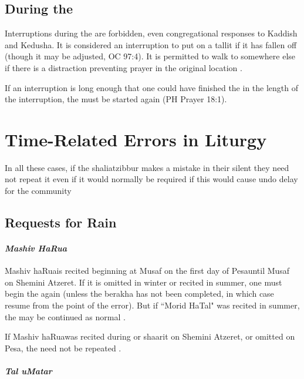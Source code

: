 \subsection{During the \amidah}

Interruptions during the \amidah are forbidden, even congregational responses to Kaddish and Kedusha. It is considered an interruption to put on a tallit if it has fallen off (though it may be adjusted, OC 97:4).  It is permitted to walk to somewhere else if there is a distraction preventing prayer in the original location \parencite*[17:15]{PH}.

If an interruption is long enough that one could have finished the \amidah in the length of the interruption, the \amidah must be started again (PH Prayer 18:1).

\section{Time-Related Errors in Liturgy}

In all these cases, if the shalia\heth\space tzibbur makes a mistake in their silent \amidah they need not repeat it even if it would normally be required if this would cause undo delay for the community \parencite*[19:13]{Kitzur}

\subsection{Requests for Rain}

\paragraph{\textit{Mashiv HaRua\heth}}

Mashiv haRua\heth\space is recited beginning at Musaf on the first day of Pesa\heth\space until Musaf on Shemini Atzeret.  If it is omitted in winter or recited in summer, one must begin the \amidah again (unless the berakha has not been completed, in which case resume from the point of the error).  But if ``Morid HaTal" was recited in summer, the \amidah may be continued as normal \parencite*[18:4-5 citing OC 114]{PH}.

If Mashiv haRua\heth\space was recited during \arvit\space or sha\heth arit on Shemini Atzeret, or omitted on Pesa\heth , the \amidah need not be repeated \parencite*[19:2,4]{Kitzur}.

\paragraph{\textit{Tal uMatar}}


